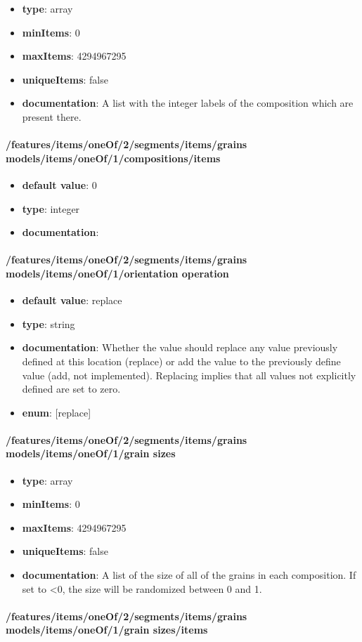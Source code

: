 \begin{itemize}\item {\bf type}: array
\item {\bf minItems}: 0
\item {\bf maxItems}: 4294967295
\item {\bf uniqueItems}: false
\item {\bf documentation}: A list with the integer labels of the composition which are present there.
\end{itemize}\paragraph{/features/items/oneOf/2/segments/items/grains models/items/oneOf/1/compositions/items}
\begin{itemize}\item {\bf default value}: 0
\item {\bf type}: integer
\item {\bf documentation}: 
\end{itemize}\paragraph{/features/items/oneOf/2/segments/items/grains models/items/oneOf/1/orientation operation}
\begin{itemize}\item {\bf default value}: replace
\item {\bf type}: string
\item {\bf documentation}: Whether the value should replace any value previously defined at this location (replace) or add the value to the previously define value (add, not implemented). Replacing implies that all values not explicitly defined are set to zero.
\item {\bf enum}: [replace]\end{itemize}\paragraph{/features/items/oneOf/2/segments/items/grains models/items/oneOf/1/grain sizes}
\begin{itemize}\item {\bf type}: array
\item {\bf minItems}: 0
\item {\bf maxItems}: 4294967295
\item {\bf uniqueItems}: false
\item {\bf documentation}: A list of the size of all of the grains in each composition. If set to <0, the size will be randomized between 0 and 1.
\end{itemize}\paragraph{/features/items/oneOf/2/segments/items/grains models/items/oneOf/1/grain sizes/items}
